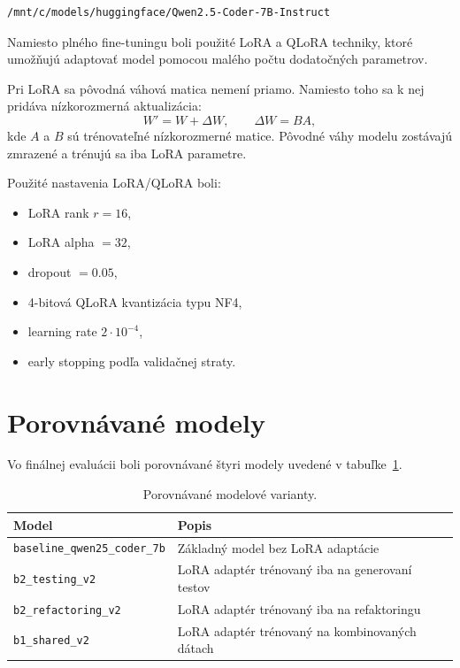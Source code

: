 \documentclass[11pt,a4paper]{article}
\newcommand{\modelbase}{\texttt{baseline\_qwen25\_coder\_7b}}
\newcommand{\modeltest}{\texttt{b2\_testing\_v2}}
\newcommand{\modelref}{\texttt{b2\_refactoring\_v2}}
\newcommand{\modelshared}{\texttt{b1\_shared\_v2}}
\begin{document}
\begin{lstlisting}
/mnt/c/models/huggingface/Qwen2.5-Coder-7B-Instruct
\end{lstlisting}

Namiesto plného fine-tuningu boli použité LoRA a QLoRA techniky, ktoré umožňujú adaptovať model pomocou malého počtu dodatočných parametrov.

Pri LoRA sa pôvodná váhová matica nemení priamo. Namiesto toho sa k nej pridáva nízkorozmerná aktualizácia:
\begin{equation}
W' = W + \Delta W,
\qquad
\Delta W = BA,
\end{equation}
kde $A$ a $B$ sú trénovateľné nízkorozmerné matice. Pôvodné váhy modelu zostávajú zmrazené a trénujú sa iba LoRA parametre.

Použité nastavenia LoRA/QLoRA boli:
\begin{itemize}
\item LoRA rank $r = 16$,
\item LoRA alpha $= 32$,
\item dropout $= 0.05$,
\item 4-bitová QLoRA kvantizácia typu NF4,
\item learning rate $2 \cdot 10^{-4}$,
\item early stopping podľa validačnej straty.
\end{itemize}

\section{Porovnávané modely}

Vo finálnej evaluácii boli porovnávané štyri modely uvedené v tabuľke~\ref{tab:models}.

\begin{table}[h]
\centering
\begin{tabular}{ll}
\toprule
Model & Popis \\
\midrule
\modelbase & Základný model bez LoRA adaptácie \\
\modeltest & LoRA adaptér trénovaný iba na generovaní testov \\
\modelref & LoRA adaptér trénovaný iba na refaktoringu \\
\modelshared & LoRA adaptér trénovaný na kombinovaných dátach \\
\bottomrule
\end{tabular}
\caption{Porovnávané modelové varianty.}
\label{tab:models}
\end{table}
\end{document}
